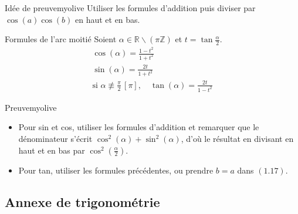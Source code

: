     \begin{demo}{Idée de preuve}{myolive}
        Utiliser les formules d’addition puis diviser par $\cos(a)\cos(b)$ en haut et en bas.
    \end{demo}

    \begin{prop}{Formules de l’arc moitié}{}
        Soient $\alpha \in \mathbb{R} \backslash \left( \pi \mathbb{Z} \right)$ et $ t = \tan \frac{\alpha}{2}$.
            \begin{align}
                \cos(\alpha)=\frac{1-t^2}{1 + t^2} \\
                \sin(\alpha) = \frac{2t}{1 + t^2} \\
                \text{si } \alpha \not\equiv \frac{\pi}{2} \, [\pi], \quad \tan(\alpha) = \frac{2t}{1 - t^2}
            \end{align}
    \end{prop}

    \begin{demo}{Preuve}{myolive}
        \begin{itemize}[label=\textcolor{myolive}{$\star$}]
            \item Pour sin et cos, utiliser les formules d’addition et remarquer que le dénominateur s’écrit $\cos^2(\alpha) + \sin^2(\alpha)$, d’où le résultat en divisant en haut et en bas par $\cos^2 \left(\frac{\alpha}{2} \right)$.
            \item Pour tan, utiliser les formules précédentes, ou prendre $b = a$ dans $(1.17)$.
        \end{itemize}
    \end{demo}

\subsection{Annexe de trigonométrie}

